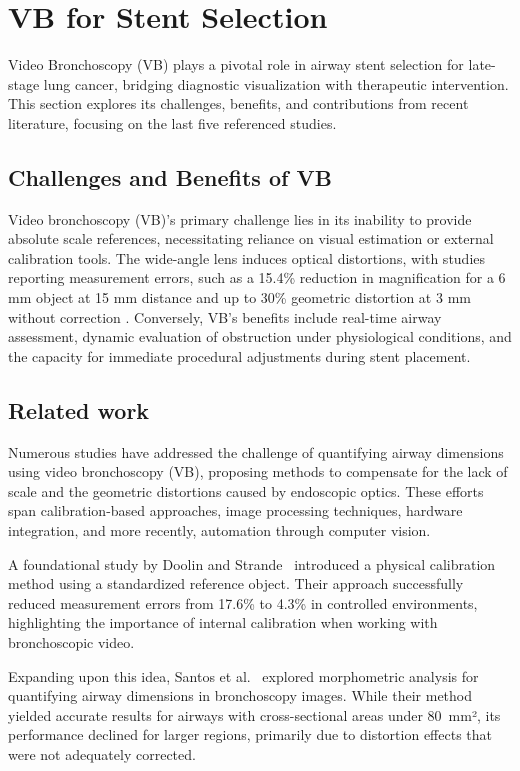 \section{VB for Stent Selection}
Video Bronchoscopy (VB) plays a pivotal role in airway stent selection for late-stage lung cancer, bridging diagnostic visualization with therapeutic intervention. This section explores its challenges, benefits, and contributions from recent literature, focusing on the last five referenced studies.

\subsection{Challenges and Benefits of VB}
Video bronchoscopy (VB)’s primary challenge lies in its inability to provide absolute scale references, necessitating reliance on visual estimation or external calibration tools. The wide-angle lens induces optical distortions, with studies reporting measurement errors, such as a 15.4\% reduction in magnification for a 6 mm object at 15 mm distance and up to 30\% geometric distortion at 3 mm without correction \cite{Leigh2005}. Conversely, VB’s benefits include real-time airway assessment, dynamic evaluation of obstruction under physiological conditions, and the capacity for immediate procedural adjustments during stent placement.

\subsection{Related work}
Numerous studies have addressed the challenge of quantifying airway dimensions using video bronchoscopy (VB), proposing methods to compensate for the lack of scale and the geometric distortions caused by endoscopic optics. These efforts span calibration-based approaches, image processing techniques, hardware integration, and more recently, automation through computer vision.

A foundational study by Doolin and Strande~\cite{doolin1995} introduced a physical calibration method using a standardized reference object. Their approach successfully reduced measurement errors from 17.6\% to 4.3\% in controlled environments, highlighting the importance of internal calibration when working with bronchoscopic video.

Expanding upon this idea, Santos et al.~\cite{santos1995} explored morphometric analysis for quantifying airway dimensions in bronchoscopy images. While their method yielded accurate results for airways with cross-sectional areas under 80~mm², its performance declined for larger regions, primarily due to distortion effects that were not adequately corrected.

